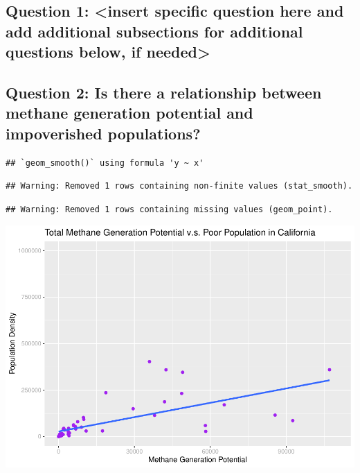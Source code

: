 \documentclass[
  12pt,
]{article}
\begin{document}
\hypertarget{question-1-insert-specific-question-here-and-add-additional-subsections-for-additional-questions-below-if-needed}{%
\subsection{Question 1: \textless insert specific question here and add
additional subsections for additional questions below, if
needed\textgreater{}}\label{question-1-insert-specific-question-here-and-add-additional-subsections-for-additional-questions-below-if-needed}}

\hypertarget{question-2-is-there-a-relationship-between-methane-generation-potential-and-impoverished-populations}{%
\subsection{Question 2: Is there a relationship between methane
generation potential and impoverished
populations?}\label{question-2-is-there-a-relationship-between-methane-generation-potential-and-impoverished-populations}}

\begin{verbatim}
## `geom_smooth()` using formula 'y ~ x'
\end{verbatim}

\begin{verbatim}
## Warning: Removed 1 rows containing non-finite values (stat_smooth).
\end{verbatim}

\begin{verbatim}
## Warning: Removed 1 rows containing missing values (geom_point).
\end{verbatim}

\includegraphics{FDR_ProjectReport_files/figure-latex/unnamed-chunk-7-1.pdf}
\end{document}
